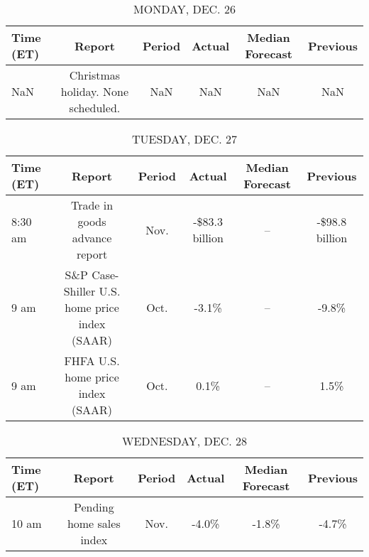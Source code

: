 \documentclass{article}%
\begin{document}
%
\normalsize%


\begin{table}[htbp]%
\caption{MONDAY, DEC. 26}%
\centering%
\begin{adjustbox}{width=1\textwidth}%
\begin{tabular}{lccccc}
\toprule
Time (ET) &                             Report & Period & Actual & Median Forecast & Previous \\
\midrule
      NaN & Christmas holiday. None scheduled. &    NaN &    NaN &             NaN &      NaN \\
\bottomrule
\end{tabular}
%
\end{adjustbox}%
\end{table}

%


\begin{table}[htbp]%
\caption{TUESDAY, DEC. 27}%
\centering%
\begin{adjustbox}{width=1\textwidth}%
\begin{tabular}{lccccc}
\toprule
Time (ET) &                                        Report & Period &         Actual & Median Forecast &       Previous \\
\midrule
  8:30 am &                 Trade in goods advance report &   Nov. & -\$83.3 billion &              -- & -\$98.8 billion \\
     9 am & S\&P Case-Shiller U.S. home price index (SAAR) &   Oct. &          -3.1\% &              -- &          -9.8\% \\
     9 am &             FHFA U.S. home price index (SAAR) &   Oct. &           0.1\% &              -- &           1.5\% \\
\bottomrule
\end{tabular}
%
\end{adjustbox}%
\end{table}

%


\begin{table}[htbp]%
\caption{WEDNESDAY, DEC. 28}%
\centering%
\begin{adjustbox}{width=1\textwidth}%
\begin{tabular}{lccccc}
\toprule
Time (ET) &                   Report & Period & Actual & Median Forecast & Previous \\
\midrule
    10 am & Pending home sales index &   Nov. &  -4.0\% &           -1.8\% &    -4.7\% \\
\bottomrule
\end{tabular}
%
\end{adjustbox}%
\end{table}
\end{document}
